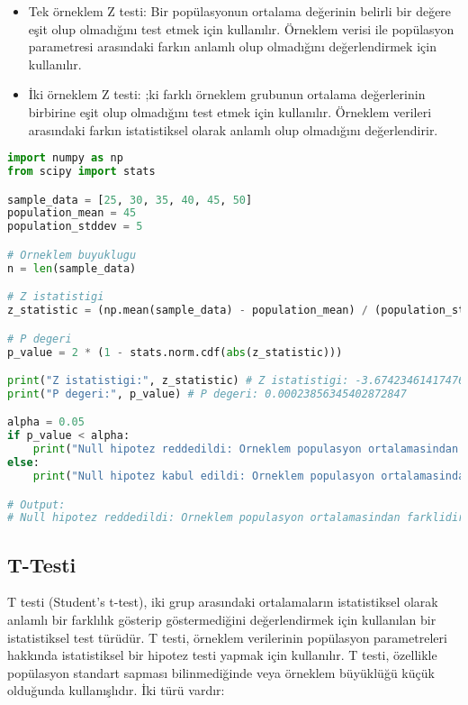 \begin{itemize}
    \item Tek örneklem Z testi: Bir popülasyonun ortalama değerinin belirli bir değere eşit olup olmadığını test etmek için kullanılır. Örneklem verisi ile popülasyon parametresi arasındaki farkın anlamlı olup olmadığını değerlendirmek için kullanılır.
    \item İki örneklem Z testi: ;ki farklı örneklem grubunun ortalama değerlerinin birbirine eşit olup olmadığını test etmek için kullanılır. Örneklem verileri arasındaki farkın istatistiksel olarak anlamlı olup olmadığını değerlendirir.
\end{itemize}

\begin{lstlisting}[language=Python]
import numpy as np
from scipy import stats

sample_data = [25, 30, 35, 40, 45, 50]
population_mean = 45
population_stddev = 5

# Orneklem buyuklugu
n = len(sample_data)

# Z istatistigi
z_statistic = (np.mean(sample_data) - population_mean) / (population_stddev / np.sqrt(n))

# P degeri
p_value = 2 * (1 - stats.norm.cdf(abs(z_statistic)))

print("Z istatistigi:", z_statistic) # Z istatistigi: -3.674234614174767
print("P degeri:", p_value) # P degeri: 0.00023856345402872847

alpha = 0.05
if p_value < alpha:
    print("Null hipotez reddedildi: Orneklem populasyon ortalamasindan farklidir.")
else:
    print("Null hipotez kabul edildi: Orneklem populasyon ortalamasindan farkli degildir.")

# Output:
# Null hipotez reddedildi: Orneklem populasyon ortalamasindan farklidir.
\end{lstlisting}

\subsection{T-Testi}
T testi (Student's t-test), iki grup arasındaki ortalamaların istatistiksel olarak anlamlı bir farklılık gösterip göstermediğini değerlendirmek için kullanılan bir istatistiksel test türüdür. T testi, örneklem verilerinin popülasyon parametreleri hakkında istatistiksel bir hipotez testi yapmak için kullanılır. T testi, özellikle popülasyon standart sapması bilinmediğinde veya örneklem büyüklüğü küçük olduğunda kullanışlıdır. İki türü vardır:

